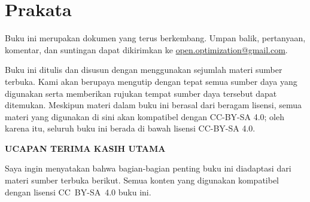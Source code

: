 \chapter*{Prakata}

Buku ini merupakan dokumen yang terus berkembang. Umpan balik, pertanyaan, komentar, dan suntingan dapat dikirimkan ke \href{mailto:open.optimization@gmail.com}{open.optimization@gmail.com}.

Buku ini ditulis dan disusun dengan menggunakan sejumlah materi sumber terbuka. Kami akan berupaya mengutip dengan tepat semua sumber daya yang digunakan serta memberikan rujukan tempat sumber daya tersebut dapat ditemukan. Meskipun materi dalam buku ini berasal dari beragam lisensi, semua materi yang digunakan di sini akan kompatibel dengan CC-BY-SA 4.0; oleh karena itu, seluruh buku ini berada di bawah lisensi CC-BY-SA 4.0.

\begin{center}
\fontsize{14pt}{16pt}\selectfont\textcolor{titletextcolour}{\textbf{UCAPAN TERIMA KASIH UTAMA}}
\end{center}

Saya ingin menyatakan bahwa bagian-bagian penting buku ini diadaptasi dari materi sumber terbuka berikut.
Semua konten yang digunakan kompatibel dengan lisensi CC~BY-SA~4.0 buku ini.

